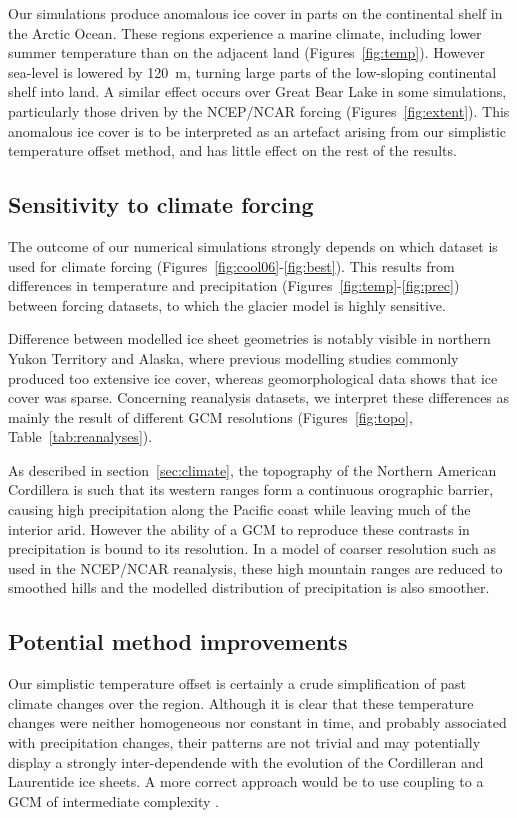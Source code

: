 Our simulations produce anomalous ice cover in parts on the continental shelf in the Arctic Ocean. These regions experience a marine climate, including lower summer temperature than on the adjacent land (Figures~\ref{fig:temp}). However sea-level is lowered by 120~m, turning large parts of the low-sloping continental shelf into land. A similar effect occurs over Great Bear Lake in some simulations, particularly those driven by the NCEP/NCAR forcing (Figures~\ref{fig:extent}). This anomalous ice cover is to be interpreted as an artefact arising from our simplistic temperature offset method, and has little effect on the rest of the results.

\subsection{Sensitivity to climate forcing}

The outcome of our numerical simulations strongly depends on which dataset is used for climate forcing (Figures~\ref{fig:cool06}-\ref{fig:best}). This results from differences in temperature and precipitation (Figures~\ref{fig:temp}-\ref{fig:prec}) between forcing datasets, to which the glacier model is highly sensitive.

Difference between modelled ice sheet geometries is notably visible in northern Yukon Territory and Alaska, where previous modelling studies commonly produced too extensive ice cover, whereas geomorphological data shows that ice cover was sparse. Concerning reanalysis datasets, we interpret these differences as mainly the result of different GCM resolutions (Figures~\ref{fig:topo}, Table~\ref{tab:reanalyses}).

As described in section~\ref{sec:climate}, the topography of the Northern American Cordillera is such that its western ranges form a continuous orographic barrier, causing high precipitation along the Pacific coast while leaving much of the interior arid. However the ability of a GCM to reproduce these contrasts in precipitation is bound to its resolution. In a model of coarser resolution such as used in the NCEP/NCAR reanalysis, these high mountain ranges are reduced to smoothed hills and the modelled distribution of precipitation is also smoother.

\subsection{Potential method improvements}

Our simplistic temperature offset is certainly a crude simplification of past climate changes over the region. Although it is clear that these temperature changes were neither homogeneous nor constant in time, and probably associated with precipitation changes, their patterns are not trivial and may potentially display a strongly inter-dependende with the evolution of the Cordilleran and Laurentide ice sheets. A more correct approach would be to use coupling to a GCM of intermediate complexity \citep{yoshimori-etal-2001,calov-etal-2002,abeouchi-etal-2007,charbit-etal-2013}.

